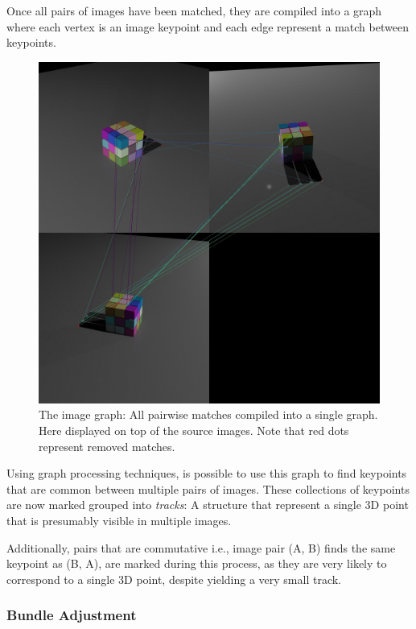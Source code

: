 \documentclass[preprint,acmtog]{acmart}
\begin{document}
Once all pairs of images have been matched, they are compiled into a graph where
each vertex is an image keypoint and each edge represent a match between
keypoints.

\begin{figure}[ht]
  \centering
  \includegraphics[width=1.0\linewidth]{filtered_image_graph}
  \caption{The image graph: All pairwise matches compiled into a single
    graph. Here displayed on top of the source images. Note that red dots
    represent removed matches.}
\end{figure}

Using graph processing techniques, is possible to use this graph to find
keypoints that are common between multiple pairs of images. These collections of
keypoints are now marked grouped into \emph{tracks}: A structure that represent
a single 3D point that is presumably visible in multiple images.

Additionally, pairs that are commutative i.e., image pair (A, B) finds the same
keypoint as (B, A), are marked during this process, as they are very likely to
correspond to a single 3D point, despite yielding a very small track.


\subsubsection{Bundle Adjustment}
\end{document}
